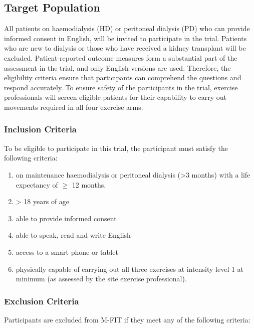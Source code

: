 \documentclass[11pt,parskip=half-]{scrartcl}
\providecommand{\tightlist}{%
  \setlength{\itemsep}{0pt}\setlength{\parskip}{0pt}}
\begin{document}
\subsection{Target Population}\label{target-population}

All patients on haemodialysis (HD) or peritoneal dialysis (PD) who can provide informed consent in English, will be invited to participate in the trial. Patients who are new to dialysis or those who have received a kidney transplant will be excluded. Patient-reported outcome measures form a substantial part of the assessment in the trial, and only English versions are used. Therefore, the eligibility criteria ensure that participants can comprehend the questions and respond accurately. To ensure safety of the participants in the trial, exercise professionals will screen eligible patients for their capability to carry out movements required in all four exercise arms.

\subsubsection{Inclusion Criteria}\label{inclusion-criteria}

To be eligible to participate in this trial, the participant must satisfy the following criteria:

\begin{enumerate}
  \def\labelenumi{\arabic{enumi}.}
  \tightlist
  \item on maintenance haemodialysis or peritoneal dialysis (>3 months) with a life expectancy of $\ge$ 12 months.
  \item > 18 years of age
  \item able to provide informed consent
  \item able to speak, read and write English
  \item access to a smart phone or tablet
  \item physically capable of carrying out all three exercises at intensity level 1 at minimum (as assessed by the site exercise professional).
\end{enumerate}

\subsubsection{Exclusion Criteria}\label{exclusion-criteria}

Participants are excluded from M-FIT if they meet any of the following criteria:
\end{document}
